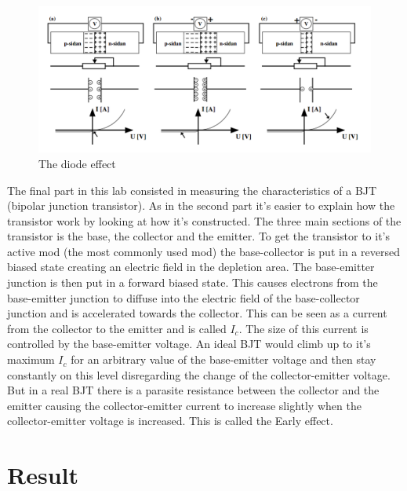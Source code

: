 \documentclass[a4paper]{article}
\begin{document}
\begin{figure}[H]
\centering
\includegraphics[scale=0.3]{diodeeffect.png}
\caption{The diode effect}
\label{diode}
\end{figure}

The final part in this lab consisted in measuring the characteristics of a BJT (bipolar junction transistor). As in the second part it's easier to explain how the transistor work by looking at how it's constructed. The three main sections of the transistor is the base, the collector and the emitter. To get the transistor to it's active mod (the most commonly used mod) the base-collector is put in a reversed biased state creating an electric field in the depletion area. The base-emitter junction is then put in a forward biased state. This causes electrons from the base-emitter junction to diffuse into the electric field of the base-collector junction and is accelerated towards the collector. This can be seen as a current from the collector to the emitter and is called $I_c$. The size of this current is controlled by the base-emitter voltage. An ideal BJT would climb up to it's maximum $I_c$ for an arbitrary value of the base-emitter voltage and then stay constantly on this level disregarding the change of the collector-emitter voltage. But in a real BJT there is a parasite resistance between the collector and the emitter causing the collector-emitter current to increase slightly when the collector-emitter voltage is increased. This is called the Early effect.

\section{Result}
\end{document}
